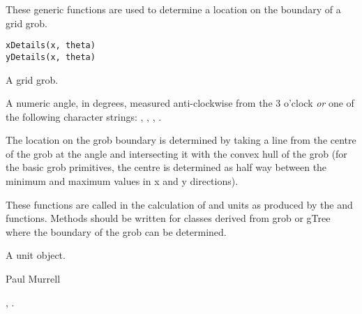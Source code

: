 %
\begin{Description}\relax
These generic functions are used to determine a location
on the boundary of a grid grob.
\end{Description}
%
\begin{Usage}
\begin{verbatim}
xDetails(x, theta)
yDetails(x, theta)
\end{verbatim}
\end{Usage}
%
\begin{Arguments}
\begin{ldescription}
\item[\code{x}]  A grid grob. 
\item[\code{theta}]  A numeric angle, in degrees, measured
anti-clockwise from the 3 o'clock \emph{or} one of
the following character strings: ,
, , .
\end{ldescription}
\end{Arguments}
%
\begin{Details}\relax
The location on the grob boundary is determined by taking
a line from the centre of the grob at the angle 
and intersecting it with the convex hull of the grob
(for the basic
grob primitives, the centre is
determined as half way between the minimum and maximum values
in x and y directions).

These functions are called in the calculation of
 and  units as produced by
the  and  functions.
Methods should be written for classes derived from grob or gTree
where the boundary of the grob can be determined.
\end{Details}
%
\begin{Value}
A unit object.
\end{Value}
%
\begin{Author}\relax
 Paul Murrell 
\end{Author}
%
\begin{SeeAlso}\relax
{},
.
\end{SeeAlso}
\clearpage
